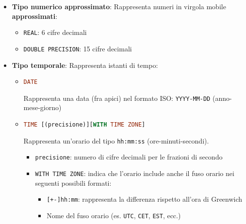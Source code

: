 \documentclass[a4paper,twoside]{article}
\begin{document}
\begin{itemize}
\begin{itemize}
      \item Valori decimali:
        \begin{itemize}
          \item 
\begin{lstlisting}[language=SQL, numbers=none]
NUMERIC | DECIMAL [(precisione [, scala])]
\end{lstlisting}
            \begin{itemize}
              \item \texttt{precisione}: numero totale di cifre (intere + decimali)
              \item \texttt{scala}: numero di cifre decimali
              \item \texttt{|}: indica che è possibile utilizzare sia \texttt{NUMERIC} che \texttt{DECIMAL}
            \end{itemize}
        \end{itemize}
    \end{itemize}

  \item \textbf{Tipo numerico approssimato}:
    Rappresenta numeri in virgola mobile \textbf{approssimati}:
    \begin{itemize}
      \item \texttt{REAL}: 6 cifre decimali
      \item \texttt{DOUBLE PRECISION}: 15 cifre decimali
    \end{itemize}

  \item \textbf{Tipo temporale}:
    Rappresenta istanti di tempo:
    \begin{itemize}
      \item 
\begin{lstlisting}[language=SQL, numbers=none]
DATE
\end{lstlisting}
        Rappresenta una data (fra apici) nel formato ISO: \texttt{YYYY-MM-DD} (anno-mese-giorno)

      \item 
\begin{lstlisting}[language=SQL, numbers=none]
TIME [(precisione)][WITH TIME ZONE]
\end{lstlisting}
      Rappresenta un'orario del tipo \texttt{hh:mm:ss} (ore-minuti-secondi). 
      \begin{itemize}
        \item \texttt{precisione}: numero di cifre decimali per le frazioni di secondo
        \item \texttt{WITH TIME ZONE}: indica che l'orario include anche il fuso orario
          nei seguenti possibili formati:
          \begin{itemize}
            \item \texttt{[+-]hh:mm}: rappresenta la differenza rispetto all'ora di
              Greenwich
            \item Nome del fuso orario (es. \texttt{UTC}, \texttt{CET}, \texttt{EST}, ecc.)
          \end{itemize}
      \end{itemize}


\end{itemize}
\end{itemize}
\end{document}
